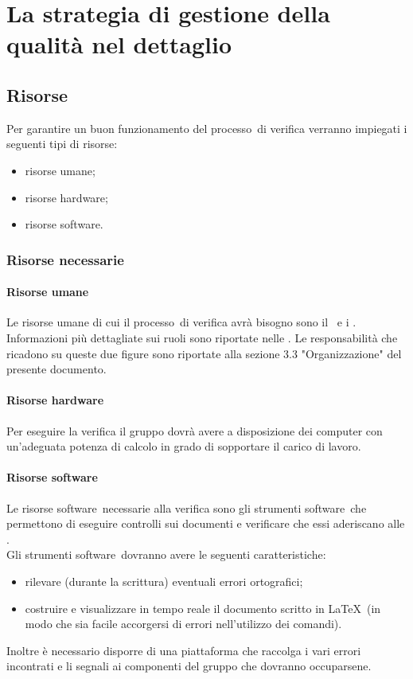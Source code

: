 \documentclass[../PianoDiQualifica.tex]{subfiles}
\begin{document}
\section{La strategia di gestione della qualità nel dettaglio}
		\subsection{Risorse}
		Per garantire un buon funzionamento del processo\g\ di verifica verranno impiegati i seguenti tipi di risorse:
		\begin{itemize}
			\item risorse umane;
			\item risorse hardware;
			\item risorse software\g.
		\end{itemize}
			\subsubsection{Risorse necessarie}
				\paragraph{Risorse umane}
				Le risorse umane di cui il processo\g\ di verifica avrà bisogno sono il \responsabilediprogetto\ e i \verificatori.
				Informazioni più dettagliate sui ruoli sono riportate nelle \normediprogettov. Le responsabilità che ricadono su queste due figure sono riportate alla sezione 3.3 "Organizzazione" del presente documento.
				\paragraph{Risorse hardware}
				Per eseguire la verifica il gruppo dovrà avere a disposizione dei computer con un'adeguata potenza di calcolo in grado di sopportare il carico di lavoro.		    
				\paragraph{Risorse software}
			    Le risorse software\g\ necessarie alla verifica sono gli strumenti software\g\ 
che permettono di eseguire controlli sui documenti e verificare che essi aderiscano alle \normediprogettov.\\
			    Gli strumenti software\g\ dovranno avere le seguenti caratteristiche:
			    \begin{itemize}
			    	\item rilevare (durante la scrittura) eventuali errori ortografici;
			    	\item costruire e visualizzare in tempo reale il documento scritto in \LaTeX\g\ (in modo che sia facile accorgersi di errori nell'utilizzo dei comandi).
			    \end{itemize}
			    Inoltre è necessario disporre di una piattaforma che raccolga i vari errori incontrati e li segnali ai componenti del gruppo che dovranno occuparsene. 
\end{document}
